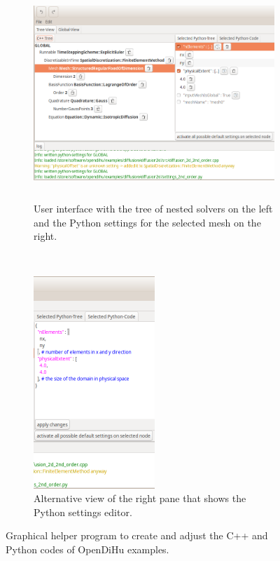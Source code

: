 \begin{figure}%
  \centering%
  \begin{subfigure}[t]{0.71\textwidth}%
    \centering%
    \includegraphics[height=8cm]{images/implementation/gui.png}
    \caption{User interface with the tree of nested solvers on the left and the Python settings for the selected mesh on the right.}%
    \label{fig:gui}%
  \end{subfigure}
  \,
  \begin{subfigure}[t]{0.27\textwidth}%
    \centering%
    \includegraphics[height=8cm]{images/implementation/gui3.png}
    \caption{Alternative view of the right pane that shows the Python settings editor.}%
    \label{fig:gui3}%
  \end{subfigure}
  \caption{Graphical helper program to create and adjust the C++ and Python codes of OpenDiHu examples.}%
  \label{fig:gui_a}%
\end{figure}%



